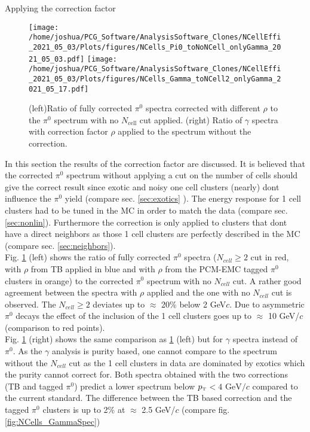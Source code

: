 \documentclass[ALICE]{ALICE_analysis_notes}
\newcommand{\pT}{$p_{\mbox{\tiny T}}$\xspace}
\newcommand{\PZ}{$\pi^0$\xspace}
\begin{document}
\begin{section}{Applying the correction factor}
	\begin{figure}[t]
		\centering
		\texttt{[image: /home/joshua/PCG\_Software/AnalysisSoftware\_Clones/NCellEffi\_2021\_05\_03/Plots/figures/NCells\_Pi0\_toNoNCell\_onlyGamma\_2021\_05\_03.pdf]}
		\texttt{[image: /home/joshua/PCG\_Software/AnalysisSoftware\_Clones/NCellEffi\_2021\_05\_03/Plots/figures/NCells\_Gamma\_toNCell2\_onlyGamma\_2021\_05\_17.pdf]}
		\caption{(left)Ratio of fully corrected $\pi^{0}$ spectra corrected with different $\rho$ to the \PZ spectrum with no $N_{\text{cell}}$ cut applied. (right) Ratio of $\gamma$ spectra with correction factor $\rho$ applied to the spectrum without the correction.}
		\label{fig:NCells_Pi0Spec}
	\end{figure}

	In this section the results of the correction factor are discussed. It is believed that the corrected \PZ spectrum without applying a cut on the number of cells should give the correct result since exotic and noisy one cell clusters (nearly) dont influence the \PZ yield (compare sec. \ref{sec:exotics} ). The energy response for 1 cell clusters had to be tuned in the MC in order to match the data (compare sec. \ref{sec:nonlin}). Furthermore the correction is only applied to clusters that dont have a direct neighbors as those 1 cell clusters are perfectly described in the MC (compare sec. \ref{sec:neighbors}).\\
	
	Fig. \ref{fig:NCells_Pi0Spec} (left) shows the ratio of fully corrected \PZ spectra ($N_{cell} \geq 2$ cut in red, with $\rho$ from TB applied in blue and with $\rho$ from the PCM-EMC tagged \PZ clusters in orange) to the corrected \PZ spectrum with no $N_{cell}$ cut. A rather good agreement between the spectra with $\rho$ applied and the one with no $N_{cell}$ cut is observed. The $N_{cell} \geq 2$ deviates up to $\approx$ 20\% below 2 GeV$c$. Due to asymmetric \PZ decays the effect of the inclusion of the 1 cell clusters goes up to $\approx$ 10 GeV/$c$ (comparison to red points).\\
	
	Fig. \ref{fig:NCells_Pi0Spec} (right) shows the same comparison as \ref{fig:NCells_Pi0Spec} (left) but for $\gamma$ spectra instead of \PZ. As the $\gamma$ analysis is purity based, one cannot compare to the spectrum without the $N_{cell}$ cut as the 1 cell clusters in data are dominated by exotics which the purity cannot correct for. Both spectra obtained with the two corrections (TB and tagged \PZ) predict a lower spectrum below \pT $< 4\text{ GeV}/c$ compared to the current standard. The difference between the TB based correction and the tagged \PZ clusters is up to 2\% at $\approx$ 2.5 GeV/$c$ (compare fig. \ref{fig:NCells_GammaSpec})
	


\end{section}
\end{document}
